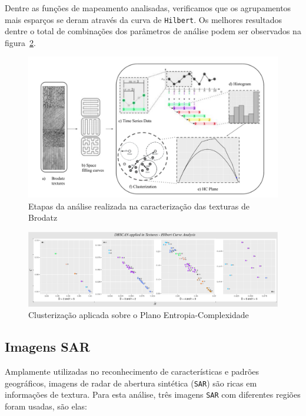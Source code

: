 \documentclass[remotesensing,article,submit,moreauthors,pdftex,10pt,a4paper]{Definitions/mdpi}
\begin{document}
	Dentre as funções de mapeamento analisadas, verificamos que os agrupamentos mais esparços se deram através da curva de \texttt{Hilbert}. Os melhores resultados dentre o total de combinações dos parâmetros de análise podem ser observados na figura~\ref{fig:DBSCAN}.
	
	\begin{figure}[!h]
		\centering
		\includegraphics[scale = 0.5]{Figures/AnalysisTextures.pdf}    
		\caption{Etapas da análise realizada na caracterização das texturas de Brodatz}
		\label{fig:AnalysisTextures}
	\end{figure}
	
	\begin{figure}[!h]
		\centering
		\includegraphics[scale = 0.4]{Figures/DBSCANgrouphilbert.png}    
		\caption{Clusterização aplicada sobre o Plano Entropia-Complexidade}
		\label{fig:DBSCAN}
	\end{figure}
	
	\newpage
	
	\subsection{Imagens SAR}\label{SAR}
	
	Amplamente utilizadas no reconhecimento de características e padrões geográficos, imagens de radar de abertura sintética (\texttt{SAR}) são ricas em informações de textura. Para esta análise, três imagens \texttt{SAR} com diferentes regiões foram usadas, são elas:
	
\end{document}
